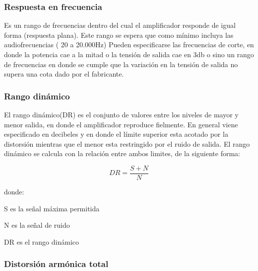 \subsubsection{Respuesta en frecuencia}

Es un rango de frecuencias dentro del cual el amplificador responde de igual forma (respuesta plana). Este rango se espera que como mínimo incluya las audiofrecuencias ( 20 a 20.000Hz)
Pueden especificarse las frecuencias de corte, en donde la potencia cae a la mitad o la tensión de salida cae en 3db o sino un rango de frecuencias en donde se cumple que la variación en la tensión de salida no supera una cota dado por el fabricante.

\subsubsection{Rango dinámico}

El rango dinámico(DR) es el conjunto de valores entre los niveles de mayor y menor salida, en donde el amplificador reproduce fielmente. En general viene especificado en decibeles y en donde el límite superior esta acotado por la distorsión mientras que el menor esta restringido por el ruido de salida. El rango dinámico se calcula con la relación entre ambos limites, de la siguiente forma:

\begin{equation}\label{rango_dinamico_eq}
DR= \frac{S+N}{N}
\end{equation}

donde:
\begin{description}
\item S es la señal máxima permitida
\item N es la señal de ruido
\item DR es el rango dinámico
\end{description}

\subsubsection{Distorsión armónica total}


%	
